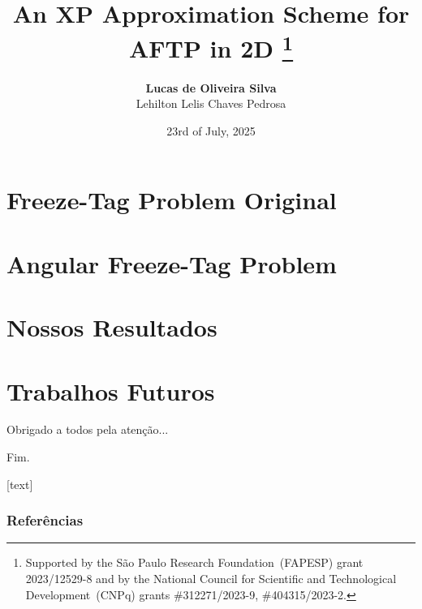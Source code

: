 \documentclass[xcolor=table]{beamer}
\title{
  \large{An XP Approximation Scheme for AFTP in 2D}%
  \texorpdfstring{\footnote{
    Supported by the São Paulo Research Foundation~(FAPESP) grant
    \mbox{2023/12529-8}
    and by the National Council for Scientific and Technological Development~(CNPq) grants
    \mbox{\#312271/2023-9},  %
    \mbox{\#404315/2023-2}.  %
    }}{}
}
\author{
  \textbf{Lucas de Oliveira Silva}\texorpdfstring{\\}{}
  Lehilton Lelis Chaves Pedrosa
}
\institute{Instituto de Computação, Unicamp}
\date{23rd of July, 2025}
\begin{document}
\begin{frame}[plain]
  \titlepage
\end{frame}



\section{Freeze-Tag Problem Original}


\section{Angular Freeze-Tag Problem}


\section{Nossos Resultados}


\section{Trabalhos Futuros}


\begin{frame}
  \large{\centerline{Obrigado a todos pela atenção...}}
  \pause
  \Huge{\centerline{Fim.}}
\end{frame}


\appendix

[text]
\begin{frame}
  \frametitle{Referências}
  {
    \tiny
    
    
  }
\end{frame}

\end{document}
